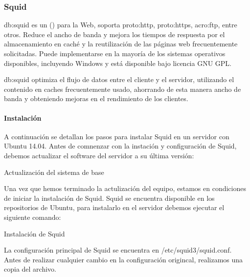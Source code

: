 \subsubsection{Squid}
\label{soa:tecnologias:squid}

\gls{db:squid} es un  () para la Web, soporta \gls{proto:http}, \gls{proto:https}, \gls{acro:ftp}, entre otros. Reduce el ancho de banda y mejora los tiempos de respuesta por el almacenamiento en caché y la reutilización de las páginas web frecuentemente solicitadas.  Puede implementarse en la mayoría de los sistemas operativos disponibles, incluyendo Windows y está disponible bajo licencia GNU GPL.

\gls{db:squid} optimiza el flujo de datos entre el cliente y el servidor, utilizando el contenido en caches frecuentemente usado, ahorrando de esta manera ancho de banda y obteniendo mejoras en el rendimiento de los clientes.

\paragraph{Instalación}

A continuación se detallan los pasos para instalar Squid en un servidor con Ubuntu 14.04.  Antes de comnenzar con la instación y configuración de Squid, debemos actualizar el software del servidor a su última versión:

\begin{listing}[H]
  \caption{Actualización del sistema de base}
  \label{soa:tecnologias:squid-cache:bash-preparacion}
\end{listing}

Una vez que hemos terminado la actulización del equipo, estamos en condiciones de iniciar la instalación de Squid.  Squid se encuentra disponible en los repositorios de Ubuntu, para instalarlo en el servidor debemos ejecutar el siguiente comando:

\begin{listing}[H]
  \caption{Instalación de Squid}
  \label{soa:tecnologias:squid-cache01:bash-preparacion}
\end{listing}

La configuración principal de Squid se encuentra en /etc/squid3/squid.conf.  Antes de realizar cualquier cambio en la configuración origincal, realizamos una copia del archivo.

